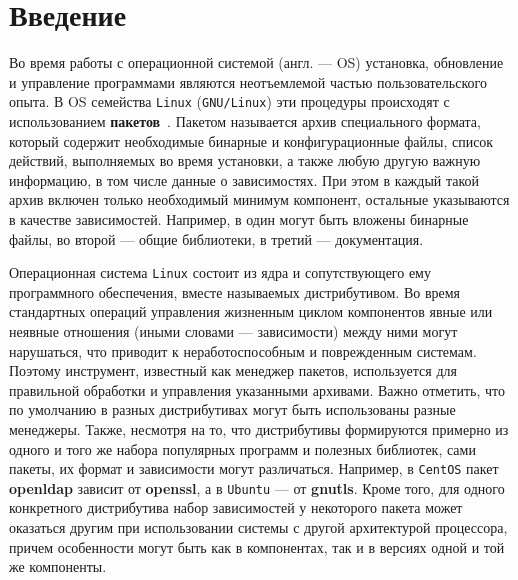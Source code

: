 
\section*{Введение}
\label{sec:intro}

Во время работы с операционной системой (англ. --- OS) установка, обновление и управление программами являются неотъемлемой частью пользовательского опыта.
В OS семейства \texttt{Linux} (\texttt{GNU/Linux}) эти процедуры происходят с использованием \textbf{пакетов}~\cite{IntroductionToLinux}.
Пакетом называется архив специального формата, который содержит необходимые бинарные и конфигурационные файлы, список действий, выполняемых во время установки, а также любую другую важную информацию, в том числе данные о зависимостях.
При этом в каждый такой архив включен только необходимый минимум компонент, остальные указываются в качестве зависимостей.
Например, в один могут быть вложены бинарные файлы, во второй --- общие библиотеки, в третий --- документация.

Операционная система \texttt{Linux} состоит из ядра и сопутствующего ему программного обеспечения, вместе называемых дистрибутивом.
Во время стандартных операций управления жизненным циклом компонентов явные или неявные отношения (иными словами --- зависимости) между ними могут нарушаться, что приводит к неработоспособным и поврежденным системам.
Поэтому инструмент, известный как менеджер пакетов, используется для правильной обработки и управления указанными архивами.
Важно отметить, что по умолчанию в разных дистрибутивах могут быть использованы разные менеджеры.
Также, несмотря на то, что дистрибутивы формируются примерно из одного и того же набора популярных программ и полезных библиотек, сами пакеты, их формат и зависимости могут различаться.
Например, в \texttt{CentOS} пакет \textbf{openldap} зависит от \textbf{openssl}, а в \texttt{Ubuntu} --- от \textbf{gnutls}.
Кроме того, для одного конкретного дистрибутива набор зависимостей у некоторого пакета может оказаться другим при использовании системы с другой архитектурой процессора, причем особенности могут быть как в компонентах, так и в версиях одной и той же компоненты.

